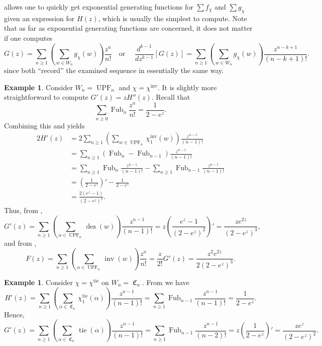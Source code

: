 \documentclass{amsart}
\DeclareMathOperator{\des}{des}
\DeclareMathOperator{\inv}{inv}
\DeclareMathOperator{\tie}{tie}
\DeclareMathOperator{\UPF}{UPF} %
\DeclareMathOperator{\Fub}{Fub}
\DeclareMathOperator{\C}{\mathfrak{C}}
\newcommand{\lp}{\left(}
\newcommand{\rp}{\right)}
\theoremstyle{definition}
\newtheorem{example}[theorem]{Example}
\begin{document}
 allows one to quickly get exponential generating functions for $\sum f_\chi$ and $\sum g_\chi$  given an expression for $H(z)$, which is usually the simplest to compute. 
Note that as far as exponential generating functions are concerned, it does not matter if one computes 
\[
G(z)=\sum_{n\geq 1} \lp \sum_{w\in W_n}g_\chi(w)\rp \frac{z^n}{n!}\quad \text{or }\quad \dfrac{d^{k-1}}{dz^{k-1}}[G(z)]=\sum_{n\geq 1} \lp \sum_{w\in W_n}g_\chi(w)\rp \frac{z^{n-k+1}}{(n-k+1)!}.
\] 
since both ``record'' the examined sequence in essentially the same way.

\begin{example}
    Consider $W_n=\UPF_n$ and $\chi=\chi^{\inv}$. 
    It is slightly more straightforward to compute $G'(z)=zH''(z)$. 
    Recall that
    \[\sum_{n\geq 0}\Fub_n \frac{z^n}{n!}=\frac{1}{2-e^z}.\]
    Combining this and  yields
    \begin{align*}
    2H'(z)
    &=2\sum_{n\geq 1} \lp \sum_{w\in \UPF_n}\chi^{\inv}_1(w)\rp \frac{z^{n-1}}{(n-1)!}\\
    &=\sum_{n\geq 1} (\Fub_n-\Fub_{n-1})\frac{z^{n-1}}{(n-1)!}\\
    &=\sum_{n\geq 1} \Fub_n\frac{z^{n-1}}{(n-1)!}-\sum_{n\geq 1} \Fub_{n-1}\frac{z^{n-1}}{(n-1)!}\\
    &=\lp \frac{1}{2-e^z}\rp'-\frac{1}{2-e^z}\\
    &=\frac{ 2( e^z-1)}{(2 - e^z)^2}.
    \end{align*}
    Thus, from ,
    \begin{equation}
   G'(z)= \sum_{n\geq 1}\lp \sum_{\alpha\in \UPF_n} \des(w)\rp \frac{z^{n-1}}{(n-1)!}=z\lp \frac{ e^z-1}{(2 - e^z)^2}\rp'=\frac{ze^{2 z}}{(2-e^z)^3},
    \end{equation}
    and from ,
    \begin{equation}
    F(z)=\sum_{n\geq 1}\lp \sum_{\alpha\in \UPF_n} \inv(w)\rp \frac{z^{n}}{n!}=\frac{z}{2!}G'(z)=\frac{z^2e^{2 z}}{2(2-e^z)^3}.
    \end{equation}
\end{example}

\begin{example}
    Consider $\chi=\chi^{\tie}$ on $W_n=\C_n$. From  we have
    \[H'(z)=\sum_{n\geq 1} \lp\sum_{\alpha\in \C_n}\chi_1^{\tie}(\alpha)\rp\frac{z^{n-1}}{(n-1)!}= \sum_{n\geq 1}\Fub_{n-1}\frac{z^{n-1}}{(n-1)!}=\frac{1}{2-e^z}.\]
    Hence, 
    \begin{equation}G'(z)=\sum_{n\geq 1} \lp\sum_{\alpha\in \C_n}\tie(\alpha)\rp\frac{z^{n-1}}{(n-1)!}=\sum_{n\geq 1}\Fub_{n-1}\frac{z^{n-1}}{(n-2)!}=z\lp \frac{1}{2-e^z}\rp'=\frac{ze^z}{(2- e^z)^2}.\end{equation}
\end{example}
\end{document}
